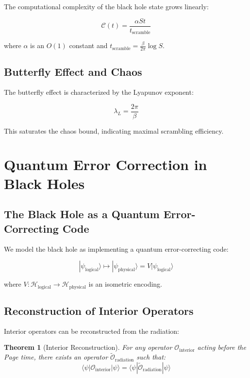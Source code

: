 \documentclass[12pt,a4paper]{article}
\newtheorem{theorem}{Theorem}[section]
\begin{document}
The computational complexity of the black hole state grows linearly:

\begin{equation}
\mathcal{C}(t) = \frac{\alpha S t}{t_{\text{scramble}}}
\end{equation}

where $\alpha$ is an $O(1)$ constant and $t_{\text{scramble}} = \frac{\beta}{2\pi} \log S$.

\subsection{Butterfly Effect and Chaos}

The butterfly effect is characterized by the Lyapunov exponent:

\begin{equation}
\lambda_L = \frac{2\pi}{\beta}
\end{equation}

This saturates the chaos bound, indicating maximal scrambling efficiency.

\section{Quantum Error Correction in Black Holes}

\subsection{The Black Hole as a Quantum Error-Correcting Code}

We model the black hole as implementing a quantum error-correcting code:

\begin{equation}
|\psi_{\text{logical}}\rangle \mapsto |\psi_{\text{physical}}\rangle = V|\psi_{\text{logical}}\rangle
\end{equation}

where $V: \mathcal{H}_{\text{logical}} \to \mathcal{H}_{\text{physical}}$ is an isometric encoding.

\subsection{Reconstruction of Interior Operators}

Interior operators can be reconstructed from the radiation:

\begin{theorem}[Interior Reconstruction]
For any operator $\mathcal{O}_{\text{interior}}$ acting before the Page time, there exists an operator $\tilde{\mathcal{O}}_{\text{radiation}}$ such that:
\begin{equation}
\langle \psi | \mathcal{O}_{\text{interior}} | \psi \rangle = \langle \psi | \tilde{\mathcal{O}}_{\text{radiation}} | \psi \rangle
\end{equation}
\end{theorem}
\end{document}
